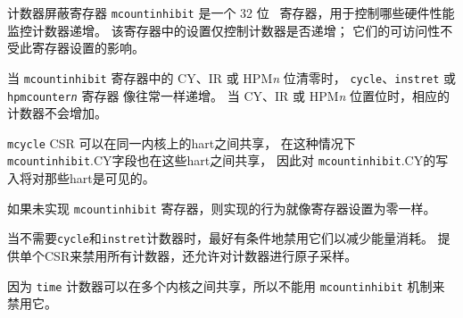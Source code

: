 \iffalse
The counter-inhibit register {\tt mcountinhibit} is a 32-bit \warl\ register
that controls which of the hardware performance-monitoring counters increment.
The settings in this register only control whether the counters increment;
their accessibility is not affected by the setting of this register.

When the CY, IR, or HPM{\em n} bit in the {\tt mcountinhibit} register is
clear, the {\tt cycle}, {\tt instret}, or {\tt hpmcounter{\em n}} register
increments as usual.  When the CY, IR, or HPM{\em n} bit is set, the
corresponding counter does not increment.

The {\tt mcycle} CSR may be shared between harts on the same core, in which
case the {\tt mcountinhibit}.CY field is also shared between those harts,
and so writes to {\tt mcountinhibit}.CY will be visible to those harts.

If the {\tt mcountinhibit} register is not implemented, the implementation
behaves as though the register were set to zero.
\fi

计数器屏蔽寄存器 {\tt mcountinhibit} 是一个 32 位 \warl\ 寄存器，用于控制哪些硬件性能监控计数器递增。 
该寄存器中的设置仅控制计数器是否递增； 它们的可访问性不受此寄存器设置的影响。

当 {\tt mcountinhibit} 寄存器中的 CY、IR 或 HPM{\em n} 位清零时，
{\tt cycle}、{\tt instret} 或 {\tt hpmcounter{\em n}} 寄存器 像往常一样递增。 
当 CY、IR 或 HPM{\em n} 位置位时，相应的计数器不会增加。

{\tt mcycle} CSR 可以在同一内核上的hart之间共享，
在这种情况下{\tt mcountinhibit}.CY字段也在这些hart之间共享，
因此对 {\tt mcountinhibit}.CY的写入将对那些hart是可见的。

如果未实现 {\tt mcountinhibit} 寄存器，则实现的行为就像寄存器设置为零一样。

\iffalse
\begin{commentary}
When the {\tt cycle} and {\tt instret} counters are not needed, it is
desirable to conditionally inhibit them to reduce energy consumption.
Providing a single CSR to inhibit all counters also allows the counters to be
atomically sampled.

Because the {\tt time} counter can be shared between multiple cores, it
cannot be inhibited with the {\tt mcountinhibit} mechanism.
\end{commentary}
\fi

\begin{commentary}
当不需要{\tt cycle}和{\tt instret}计数器时，最好有条件地禁用它们以减少能量消耗。 
提供单个CSR来禁用所有计数器，还允许对计数器进行原子采样。

因为 {\tt time} 计数器可以在多个内核之间共享，所以不能用 {\tt mcountinhibit} 机制来禁用它。
\end{commentary}


